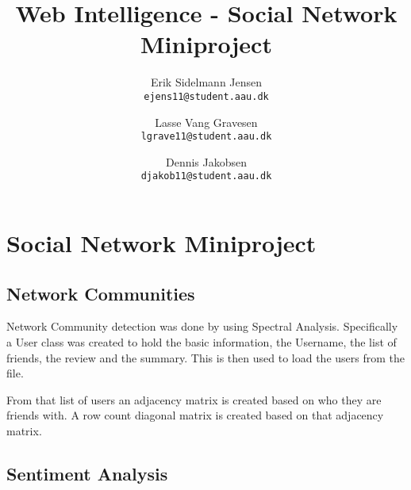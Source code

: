 

\author{
  Erik Sidelmann Jensen\\
  \texttt{ejens11@student.aau.dk}
  \and
  Lasse Vang Gravesen\\
  \texttt{lgrave11@student.aau.dk}
  \and
  Dennis Jakobsen\\
  \texttt{djakob11@student.aau.dk}  
}

\title{Web Intelligence - Social Network Miniproject}
\date{}


	\clearpage\maketitle
	\thispagestyle{empty}
	
	\chapter{Social Network Miniproject}
	\section{Network Communities}
	Network Community detection was done by using Spectral Analysis. Specifically a User class was created to hold the basic information, the Username, the list of friends, the review and the summary. This is then used to load the users from the file.
	
	From that list of users an adjacency matrix is created based on who they are friends with. A row count diagonal matrix is created based on that adjacency matrix.
	
	\section{Sentiment Analysis}


